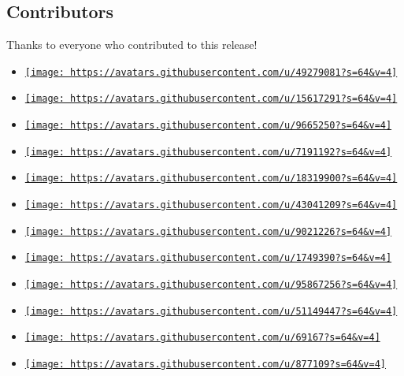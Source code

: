 \subsection{Contributors}\label{contributors}

Thanks to everyone who contributed to this release!

\begin{itemize}
\tightlist
\item
  \href{https://github.com/Marmare314}{\texttt{[image: https://avatars.githubusercontent.com/u/49279081?s=64\&v=4]}}
\item
  \href{https://github.com/dccsillag}{\texttt{[image: https://avatars.githubusercontent.com/u/15617291?s=64\&v=4]}}
\item
  \href{https://github.com/Dherse}{\texttt{[image: https://avatars.githubusercontent.com/u/9665250?s=64\&v=4]}}
\item
  \href{https://github.com/EpicEricEE}{\texttt{[image: https://avatars.githubusercontent.com/u/7191192?s=64\&v=4]}}
\item
  \href{https://github.com/Leedehai}{\texttt{[image: https://avatars.githubusercontent.com/u/18319900?s=64\&v=4]}}
\item
  \href{https://github.com/G1gg1L3s}{\texttt{[image: https://avatars.githubusercontent.com/u/43041209?s=64\&v=4]}}
\item
  \href{https://github.com/PgBiel}{\texttt{[image: https://avatars.githubusercontent.com/u/9021226?s=64\&v=4]}}
\item
  \href{https://github.com/RLangendam}{\texttt{[image: https://avatars.githubusercontent.com/u/1749390?s=64\&v=4]}}
\item
  \href{https://github.com/Raphael-CV}{\texttt{[image: https://avatars.githubusercontent.com/u/95867256?s=64\&v=4]}}
\item
  \href{https://github.com/SekoiaTree}{\texttt{[image: https://avatars.githubusercontent.com/u/51149447?s=64\&v=4]}}
\item
  \href{https://github.com/SteamedFish}{\texttt{[image: https://avatars.githubusercontent.com/u/69167?s=64\&v=4]}}
\item
  \href{https://github.com/asayers}{\texttt{[image: https://avatars.githubusercontent.com/u/877109?s=64\&v=4]}}

\end{itemize}
